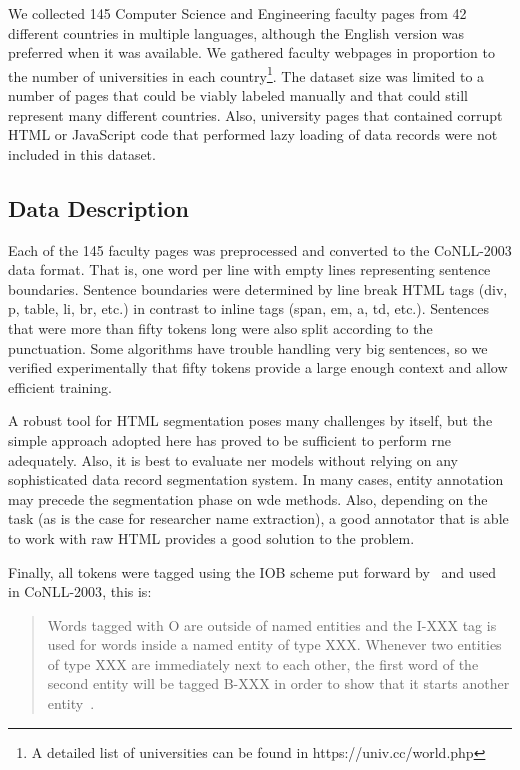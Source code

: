 \documentclass{nle}
\begin{document}
We collected 145 Computer Science and Engineering faculty pages from 42 different countries in
multiple languages, although the English version was preferred when it was available.
We gathered faculty webpages in proportion to
the number of universities in each country\footnote{A detailed list of universities can
be found in https://univ.cc/world.php}. 
The dataset size was limited to a number of pages that could be viably labeled manually and
that could still represent many different countries. 
Also, university pages that contained 
corrupt HTML or JavaScript code that performed lazy loading of data records were
not included in this dataset.

\subsection{Data Description} 
\label{sec:data_description}

Each of the 145 faculty pages was preprocessed and converted
to the {CoNLL-2003} data format. That is, one word per line with empty lines representing
sentence boundaries. Sentence boundaries were determined by line break HTML tags
(div, p, table, li, br, etc.) in contrast to inline tags (span, em, a, td, etc.). 
Sentences that were more than fifty tokens long were also split according to the
punctuation. Some algorithms have trouble handling very big sentences, so we verified
experimentally that fifty tokens provide a large enough context 
and allow efficient training. 


A robust tool for HTML segmentation poses many challenges by itself, but the simple approach 
adopted here has proved to be sufficient to perform \gls{rne} adequately. 
Also, it is best to evaluate \gls{ner} models without relying on any sophisticated data 
record segmentation system.
In many cases, entity annotation may precede the segmentation
phase on \gls{wde} methods. Also, depending on the task (as is the case
for researcher name extraction), a good annotator that is able to work 
with raw HTML provides a good solution to the problem.

Finally, all tokens were tagged using the IOB scheme put forward by~\cite{Ramshaw1999}
and used in {CoNLL-2003}, this is:

\begin{quote}
Words tagged with O are outside of named entities
and the I-XXX tag is used for words inside a
named entity of type XXX. Whenever two entities of
type XXX are immediately next to each other, the
first word of the second entity will be tagged B-XXX
in order to show that it starts another entity~\cite{KimSang2003}.
\end{quote}
\end{document}
